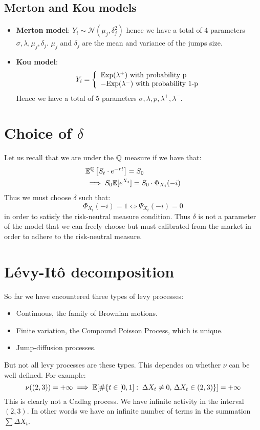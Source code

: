 \subsection*{Merton and Kou models}
\begin{itemize}
    \item \textbf{Merton model}: $Y_i \sim \mathcal{N}(\mu_j, \delta_j^2)$ hence
        we have a total of 4 parameters $\sigma, \lambda, \mu_j, \delta_j$.
        $\mu_j$ and $\delta_j$ are the mean and variance of the jumps size.
    \item \textbf{Kou model}:
        \[
            Y_i = \left\{ \begin{array}{l}
                    \text{Exp}(\lambda^+) \text{ with probability }
                    $p$ \\
                    -\text{Exp}(\lambda^-) \text{ with probability }
                    $1-p$
                \end{array} \right.
        \]
        Hence we have a total of 5 parameters $\sigma, \lambda, p, \lambda^+,
        \lambda^-$.
\end{itemize}

\section{Choice of \texorpdfstring{$\delta$}{delta}}
Let us recall that we are under the $\mathbb{Q}$ measure if we have that:
\begin{align*}
    & \mathbb{E}^{\mathbb{Q}} \left[ S_t \cdot e^{-rt} \right] = S_0 \\
    & \implies S_0 \mathbb{E}[e^{X_t}] = S_0 \cdot \Phi_{X_t}(-i)
\end{align*}
Thus we must choose $\delta$ such that:
\[ \Phi_{X_t}(-i) = 1 \iff \Psi_{X_t}(-i) = 0 \]
in order to satisfy the risk-neutral measure condition. Thus $\delta$ is not a
parameter of the model that we can freely choose but must calibrated from the
market in order to adhere to the risk-neutral measure.

\section{Lévy-Itô decomposition}
So far we have encountered three types of levy processes:
\begin{itemize}
    \item Continuous, the family of Brownian motions.
    \item Finite variation, the Compound Poisson Process, which is unique.
    \item Jump-diffusion processes.
\end{itemize}
But not all levy processes are these types. This dependes on whether $\nu$ can
be well defined.
For example:
\[ \nu((2,3)) = +\infty \implies \mathbb{E} [ \# \{ t\in[0,1]: \; \Delta X_t \neq 0, \,
    \Delta X_t \in (2,3) \} ] = +\infty \]
This is clearly not a Cadlag process. We have infinite activity in the interval
$(2,3)$. In other words we have an infinite number of terms in the summation
$\sum \Delta X_t$.

